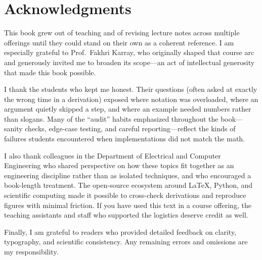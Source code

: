 
\section*{Acknowledgments}
\begingroup
\sloppy

\noindent
This book grew out of teaching and of revising lecture notes across multiple
offerings until they could stand on their own as a coherent reference. I am
especially grateful to Prof.~Fakhri Karray, who originally shaped that course
arc and generously invited me to broaden its scope---an act of intellectual
generosity that made this book possible.

\medskip
\noindent
I thank the students who kept me honest. Their questions (often asked at exactly
the wrong time in a derivation) exposed where notation was overloaded, where an
argument quietly skipped a step, and where an example needed numbers rather than
slogans. Many of the ``audit'' habits emphasized throughout the book---sanity
checks, edge-case testing, and careful reporting---reflect the kinds of failures
students encountered when implementations did not match the math.

\medskip
\noindent
I also thank colleagues in the Department of Electrical and Computer Engineering
who shared perspective on how these topics fit together as an engineering
discipline rather than as isolated techniques, and who encouraged a book-length
treatment. The open-source ecosystem around \LaTeX{}, Python, and scientific
computing made it possible to cross-check derivations and reproduce figures with
minimal friction. If you have used this text in a course offering, the teaching
assistants and staff who supported the logistics deserve credit as well.

\medskip
\noindent
Finally, I am grateful to readers who provided detailed feedback on clarity,
typography, and scientific consistency. Any remaining errors and omissions are
my responsibility.
\endgroup
